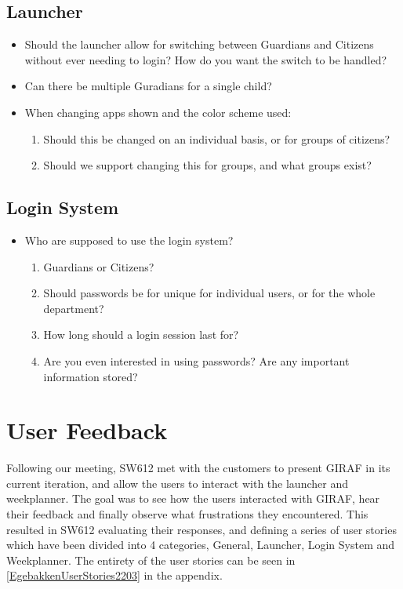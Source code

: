 \subsection{Launcher}
\begin{itemize}
  \item Should the launcher allow for switching between Guardians and Citizens
  without ever needing to login? How do you want the switch to be handled?
  \item Can there be multiple Guradians for a single child?
  \item When changing apps shown and the color scheme used:
  	\begin{enumerate}
  	\item Should this be changed on an individual basis, or for groups of
  	citizens?
  	\item Should we support changing this for groups, and what groups exist?
	\end{enumerate}
\end{itemize}

\subsection{Login System}
\begin{itemize}
  \item Who are supposed to use the login system?
  	\begin{enumerate}
  	\item Guardians or Citizens?
  	\item Should passwords be for unique for individual users, or for the whole
  	department?
  	\item How long should a login session last for?
  	\item Are you even interested in using passwords? Are any important
  	information stored?
	\end{enumerate}
\end{itemize}

\section{User Feedback}
Following our meeting, SW612 met with the customers to present GIRAF in its
current iteration, and allow the users to interact with the launcher and
weekplanner.
The goal was to see how the users interacted with GIRAF, hear their feedback and
finally observe what frustrations they encountered. This resulted in SW612
evaluating their responses, and defining a series of user stories which have
been divided into 4 categories, General, Launcher, Login System and Weekplanner.
The entirety of the user stories can be seen in
\autoref{EgebakkenUserStories2203} in the appendix.\nl

